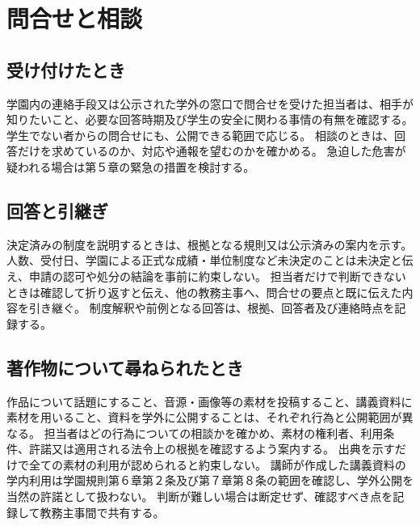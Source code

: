 ﻿\newpage
\chapter{問合せと相談}

\section{受け付けたとき}

学園内の連絡手段又は公示された学外の窓口で問合せを受けた担当者は、相手が知りたいこと、必要な回答時期及び学生の安全に関わる事情の有無を確認する。
学生でない者からの問合せにも、公開できる範囲で応じる。
相談のときは、回答だけを求めているのか、対応や通報を望むのかを確かめる。
急迫した危害が疑われる場合は第５章の緊急の措置を検討する。

\section{回答と引継ぎ}

決定済みの制度を説明するときは、根拠となる規則又は公示済みの案内を示す。
人数、受付日、学園による正式な成績・単位制度など未決定のことは未決定と伝え、申請の認可や処分の結論を事前に約束しない。
担当者だけで判断できないときは確認して折り返すと伝え、他の教務主事へ、問合せの要点と既に伝えた内容を引き継ぐ。
制度解釈や前例となる回答は、根拠、回答者及び連絡時点を記録する。

\section{著作物について尋ねられたとき}

作品について話題にすること、音源・画像等の素材を投稿すること、講義資料に素材を用いること、資料を学外に公開することは、それぞれ行為と公開範囲が異なる。
担当者はどの行為についての相談かを確かめ、素材の権利者、利用条件、許諾又は適用される法令上の根拠を確認するよう案内する。
出典を示すだけで全ての素材の利用が認められると約束しない。
講師が作成した講義資料の学内利用は学園規則第６章第２条及び第７章第８条の範囲を確認し、学外公開を当然の許諾として扱わない。
判断が難しい場合は断定せず、確認すべき点を記録して教務主事間で共有する。
